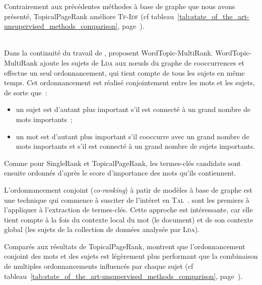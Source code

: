         Contrairement aux précédentes méthodes à base de graphe que nous avons
        présenté, TopicalPageRank améliore \textsc{Tf-Idf} (cf
        tableau~\ref{tab:state_of_the_art-unsupervised_methods_comparison},
        page~\pageref{tab:state_of_the_art-unsupervised_methods_comparison}).

        ~\\Dans la continuité du travail de ,
         proposent WordTopic-MultiRank.
        WordTopic-MultiRank ajoute les sujets de \textsc{Lda} aux n\oe{}uds du
        graphe de cooccurrences et effectue un seul ordonnancement, qui tient
        compte de tous les sujets en même temps. Cet ordonnancement est réalisé
        conjointement entre les mots et les sujets, de sorte que~:
        \begin{itemize}
          \item{un sujet est d'autant plus important s'il est connecté à un
                grand nombre de mots importants~;}
          \item{un mot est d'autant plus important s'il cooccurre avec un grand
                nombre de mots importants et s'il est connecté à un grand nombre
                de sujets importants.}
        \end{itemize}
        Comme pour SingleRank et TopicalPageRank, les termes-clés candidats sont
        ensuite ordonnés d'après le score d'importance des mots qu'ils
        contiennent.

        L'ordonnancement conjoint (\textit{co-ranking}) à patir de modèles à
        base de graphe est une technique qui commence à susciter de l'intéret en
        \textsc{Tal}~\cite{wan2011corankingsummarization,yan2012corankingtweetrecommendation,liu2014corankingopinionmining}.
         sont les premiers à l'appliquer à
        l'extraction de termes-clés. Cette approche est intéressante, car elle
        tient compte à la fois du contexte local du mot (le document) et de son
        contexte global (les sujets de la collection de données analysée par
        \textsc{Lda}).

        Comparés aux résultats de TopicalPageRank,
         montrent que l'ordonnancement
        conjoint des mots et des sujets est légèrement plus performant que la
        combinaison de multiples ordonnancements influencés par chaque sujet
        (cf tableau~\ref{tab:state_of_the_art-unsupervised_methods_comparison},
        page~\pageref{tab:state_of_the_art-unsupervised_methods_comparison}).

